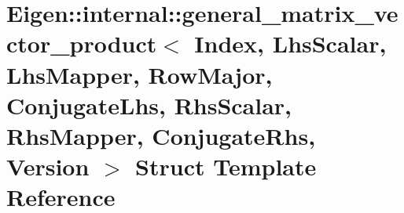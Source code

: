 \hypertarget{struct_eigen_1_1internal_1_1general__matrix__vector__product_3_01_index_00_01_lhs_scalar_00_01_l24320a1e63993864008333cadda60258}{}\section{Eigen\+:\+:internal\+:\+:general\+\_\+matrix\+\_\+vector\+\_\+product$<$ Index, Lhs\+Scalar, Lhs\+Mapper, Row\+Major, Conjugate\+Lhs, Rhs\+Scalar, Rhs\+Mapper, Conjugate\+Rhs, Version $>$ Struct Template Reference}
\label{struct_eigen_1_1internal_1_1general__matrix__vector__product_3_01_index_00_01_lhs_scalar_00_01_l24320a1e63993864008333cadda60258}
